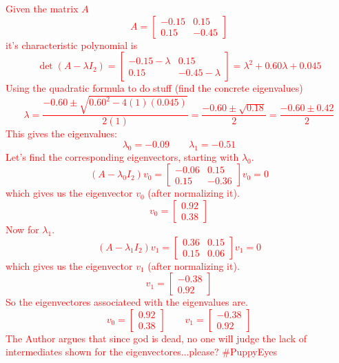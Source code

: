 \documentclass[12pt]{article}
\begin{document}
\textcolor{red}{Given the matrix $A$ 
\begin{equation*}
    A = \begin{bmatrix}
        -0.15 & 0.15 \\
        0.15 & -0.45
    \end{bmatrix}
\end{equation*}
it's characteristic polynomial is
\[
\det(A-\lambda I_2) = \begin{bmatrix}
        -0.15- \lambda & 0.15 \\
        0.15 & -0.45 - \lambda
    \end{bmatrix} = \lambda^2 + 0.60\lambda + 0.045
\]
Using the quadratic formula to do stuff (find the concrete eigenvalues)
\[
\lambda = \frac{-0.60 \pm \sqrt{0.60^2 - 4(1)(0.045)}}{2(1)} = \frac{-0.60 \pm \sqrt{0.18}}{2} = \frac{-0.60 \pm 0.42}{2}
\]
This gives the eigenvalues:
\begin{equation} \label{EigVal}
    \lambda_0 = -0.09 \qquad \lambda_1 = -0.51
\end{equation}
Let's find the corresponding eigenvectors, starting with $\lambda_0$.
\begin{equation*}
    (A - \lambda_0 I_2)v_0 = \begin{bmatrix}
        -0.06 & 0.15 \\
        0.15 & -0.36
    \end{bmatrix}v_0 = 0
\end{equation*}
 which gives us the eigenvector $v_0$ (after normalizing it).
\begin{equation*}
    v_0 = \begin{bmatrix}
        0.92 \\
        0.38
    \end{bmatrix}
\end{equation*}
Now for $\lambda_1$.
\begin{equation*}
    (A - \lambda_1 I_2)v_1 = \begin{bmatrix}
        0.36 & 0.15 \\
        0.15 & 0.06
    \end{bmatrix}v_1 = 0
\end{equation*}
which gives us the eigenvector $v_1$ (after normalizing it).
\begin{equation*}
    v_1 = \begin{bmatrix}
        -0.38 \\
        0.92
    \end{bmatrix}
\end{equation*}
So the eigenvectores associateed with the eigenvalues are.
\begin{equation} \label{EigVec}
    v_0 = \begin{bmatrix}
        0.92 \\
        0.38
    \end{bmatrix} \qquad v_1 = \begin{bmatrix}
        -0.38 \\
        0.92
    \end{bmatrix}
\end{equation}
The Author argues that since god is dead, no one will judge the lack of intermediates shown for the eigenvectores...please? \#PuppyEyes
}
\end{document}
